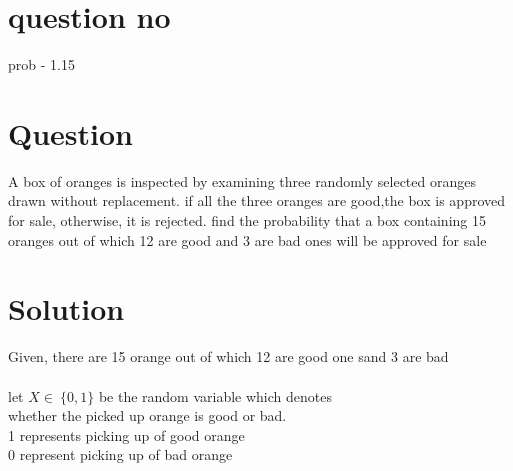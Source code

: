 \documentclass[journal,12pt,twocolumn]{IEEEtran}
\begin{document}
\section*{question no}
prob -  1.15
\section*{Question}
A box of oranges is inspected by examining  three randomly selected oranges drawn without replacement. if all the three oranges are good,the box is approved for sale, otherwise, it is rejected. find the probability that a box containing 15 oranges out of which 12 are good and 3 are bad ones will be approved for sale 
\section*{Solution}
 Given, there are 15 orange out of which 12 are good one sand 3 are bad\\\\
let $X \in\ \{0,1\}$ be the random variable  which denotes\\ whether the picked up orange is good or bad.\\
 1 represents picking up of good orange\\
 0 represent picking up of  bad  orange\\
\end{document}
